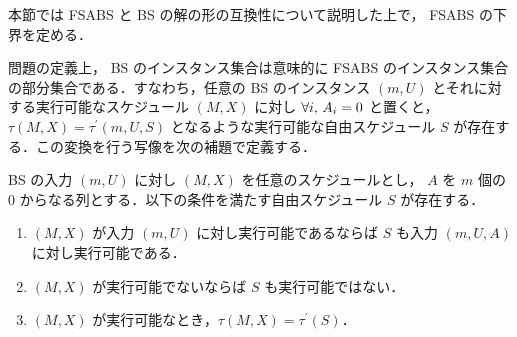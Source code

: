 本節では FSABS と BS の解の形の互換性について説明した上で， FSABS の下界を定める．

問題の定義上， BS のインスタンス集合は意味的に FSABS のインスタンス集合の部分集合である．すなわち，任意の BS のインスタンス $(m, U)$ とそれに対する実行可能なスケジュール $(M, X)$ に対し $\forall i,\, A_i = 0$ と置くと， $\tau(M, X) = \tau^\prime(m, U, S)$ となるような実行可能な自由スケジュール $S$ が存在する．この変換を行う写像を次の補題で定義する．
\begin{lemma}\label{lemma:bs-to-fsabs}
  BS の入力 $(m, U)$ に対し $(M, X)$ を任意のスケジュールとし， $A$ を $m$ 個の 0 からなる列とする．以下の条件を満たす自由スケジュール $S$ が存在する．
  \begin{enumerate}
  \item $(M, X)$ が入力 $(m, U)$ に対し実行可能であるならば $S$ も入力 $(m, U, A)$ に対し実行可能である．
  \item $(M, X)$ が実行可能でないならば $S$ も実行可能ではない．
  \item $(M, X)$ が実行可能なとき，$\tau(M, X) = \tau^\prime(S)$．
  \end{enumerate}
\end{lemma}
